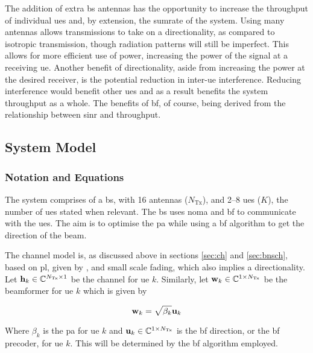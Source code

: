 \par
The addition of extra \ac{bs} antennas has the opportunity to increase the throughput of individual \acp{ue} and, by extension, the sumrate of the system.
Using many antennas allows transmissions to take on a directionality, as compared to isotropic transmission, though radiation patterns will still be imperfect.
This allows for more efficient use of power, increasing the power of the signal at a receiving \ac{ue}.
Another benefit of directionality, aside from increasing the power at the desired receiver, is the potential reduction in inter-\ac{ue} interference.
Reducing interference would benefit other \acp{ue} and as a result benefits the system throughput as a whole.
The benefits of \acl{bf}, of course, being derived from the relationship between \ac{sinr} and throughput.

\subsection{System Model}
\subsubsection{Notation and Equations}
The system comprises of a \ac{bs}, with 16 antennas ($N_{\mathrm{Tx}}$), and 2--8 \acp{ue} ($K$), the number of \acp{ue} stated when relevant.
The \ac{bs} uses \ac{noma} and \ac{bf} to communicate with the \acp{ue}.
The aim is to optimise the \acl{pa} while using a \ac{bf} algorithm to get the direction of the beam.

\par
The channel model is, as discussed above in sections \ref{sec:ch} and \ref{sec:bnsch}, based on \ac{pl}, given by , and small scale fading, which also implies a directionality.
Let $ \mathbf{h}_k  \in \mathbb{C}^{N_{\textrm{Tx}}\times 1}$ be the channel for \ac{ue} $ k $.
Similarly, let $ \mathbf{w}_k \in \mathbb{C}^{1\times N_{\textrm{Tx}}}$ be the beamformer for \ac{ue} $ k $ which is given by

\begin{equation}
	\mathbf{w}_k = \sqrt{\beta_k} \mathbf{u}_k 
\end{equation}

\par
Where $\beta_k$ is the \ac{pa} for \ac{ue} $k$ and $\mathbf{u}_k \in \mathbb{C}^{1\times N_{\textrm{Tx}}}$ is the \ac{bf} direction, or the \ac{bf} precoder, for \ac{ue} $k$.
This will be determined by the \ac{bf} algorithm employed.

